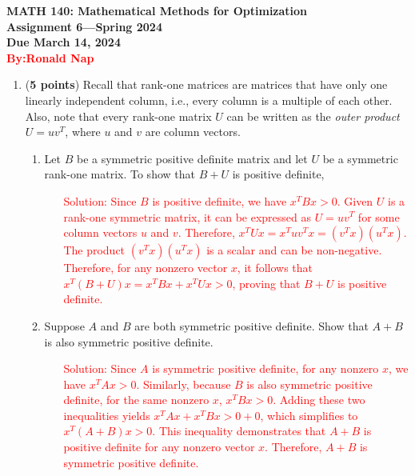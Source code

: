 \documentclass[11pt]{article}
\begin{document}
\pagestyle{empty}

\begin{center}
{\large {\bf MATH 140: Mathematical Methods for Optimization}}\\
{\bf Assignment 6---Spring 2024}\\
{\bf Due March 14, 2024} \\
{\textcolor{red}{\bf By:Ronald Nap}}

\end{center}

\begin{enumerate}

\item (\textbf{5 points}) Recall that rank-one matrices are matrices that have only one linearly independent column, i.e., every column is a multiple of each other. Also, note that every rank-one matrix $U$ can be written as the \textsl{outer product} $U = uv^T$, where $u$ and $v$ are column vectors.
\begin{enumerate}
    \item Let $B$ be a symmetric positive definite matrix and let $U$ be a symmetric rank-one matrix. To show that $B+U$ is positive definite, 
    \begin{enumerate}
        \item[\textcolor{red}{Solution:}] 
        \textcolor{red}{Since $B$ is positive definite, we have $x^TBx > 0$.} 
        \textcolor{red}{Given $U$ is a rank-one symmetric matrix, it can be expressed as $U = uv^T$ for some column vectors $u$ and $v$.} 
        \textcolor{red}{Therefore, $x^TUx = x^Tuv^Tx = (v^Tx)(u^Tx)$.} 
        \textcolor{red}{The product $(v^Tx)(u^Tx)$ is a scalar and can be non-negative.} 
        \textcolor{red}{Therefore, for any nonzero vector $x$, it follows that $x^T(B+U)x = x^TBx + x^TUx > 0$,} 
        \textcolor{red}{proving that $B+U$ is positive definite.}
    \end{enumerate}

    \item Suppose $A$ and $B$ are both symmetric positive definite.
    Show that $A+B$ is also symmetric positive definite.
    
\begin{enumerate}
    \item[\textcolor{red}{Solution:}] 
    \textcolor{red}{Since $A$ is symmetric positive definite, for any nonzero $x$, we have $x^TAx > 0$.}
    \textcolor{red}{Similarly, because $B$ is also symmetric positive definite, for the same nonzero $x$, $x^TBx > 0$.}
    \textcolor{red}{Adding these two inequalities yields $x^TAx + x^TBx > 0 + 0$, which simplifies to $x^T(A+B)x > 0$.}
    \textcolor{red}{This inequality demonstrates that $A+B$ is positive definite for any nonzero vector $x$.}
    \textcolor{red}{Therefore, $A+B$ is symmetric positive definite.}
\end{enumerate}


\end{enumerate}
\end{enumerate}
\end{document}
